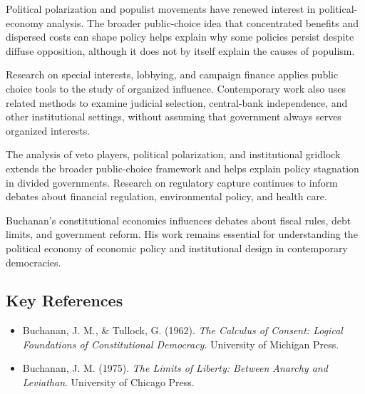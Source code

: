 Political polarization and populist movements have renewed interest in
political-economy analysis. The broader public-choice idea that concentrated
benefits and dispersed costs can shape policy helps explain why some policies
persist despite diffuse opposition, although it does not by itself explain
the causes of populism.

Research on special interests, lobbying, and campaign finance applies public
choice tools to the study of organized influence. Contemporary work also uses
related methods to examine judicial selection, central-bank independence, and
other institutional settings, without assuming that government always serves
organized interests.

The analysis of veto players, political polarization, and institutional
gridlock extends the broader public-choice framework and helps explain policy
stagnation in divided governments. Research on regulatory capture continues to
inform debates about financial regulation, environmental policy, and health
care.

Buchanan's constitutional economics influences debates about fiscal rules,
debt limits, and government reform. His work remains essential for
understanding the political economy of economic policy and institutional
design in contemporary democracies.

\subsection*{Key References}
\begin{itemize}
    \item Buchanan, J. M., \& Tullock, G. (1962). \textit{The Calculus of Consent: Logical Foundations of Constitutional Democracy}. University of Michigan Press.
    \item Buchanan, J. M. (1975). \textit{The Limits of Liberty: Between Anarchy and Leviathan}. University of Chicago Press.
\end{itemize}
